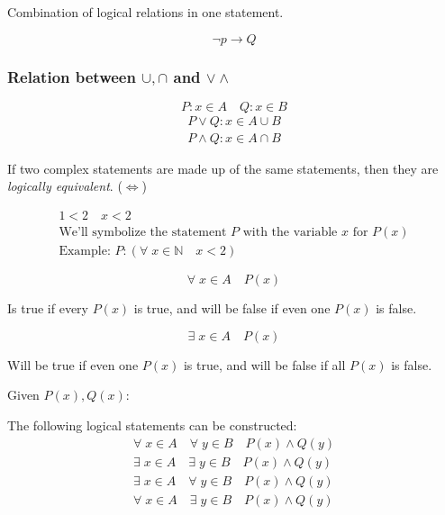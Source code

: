 \documentclass[00_complete]{subfiles}
\begin{document}
\begin{definition}
Combination of logical relations in one statement.
\begin{example}
    $$\neg p \to Q$$
\end{example}
\end{definition}

\subsubsection{Relation between $\cup, \cap$ and $\lor \land$}
$$P : x \in A \quad Q: x \in B$$
$$
\begin{gathered}
    P \lor Q : x \in A \cup B \\
    P \land Q: x \in A \cap B
\end{gathered}
$$

\begin{definition}
If two complex statements are made up of the same statements, then they are
\emph{logically equivalent}. ($\iff$)
\end{definition}

$$
\begin{gathered}
    1<2 \quad x<2 \\
    \text{We'll symbolize the statement $P$ with the variable $x$ for $P(x)$} \\
    \text{Example: }P: (\forall \; x \in \mathbb{N} \quad x<2)
\end{gathered}
$$

$$\forall \; x \in A \quad P(x)$$

Is true if every $P(x)$ is true, and will be false if even one $P(x)$ is false.

$$\exists \; x \in A \quad P(x)$$

Will be true if even one $P(x)$ is true, and will be false if all $P(x)$ is false.

Given $P(x), Q(x)$:

The following logical statements can be constructed:
$$
\begin{gathered}
    \forall \; x \in A \quad \forall \; y \in B \quad P(x) \land Q(y) \\
    \exists \; x \in A \quad \exists \; y \in B \quad P(x) \land Q(y) \\
    \exists \; x \in A \quad \forall \; y \in B \quad P(x) \land Q(y) \\
    \forall \; x \in A \quad \exists \; y \in B \quad P(x) \land Q(y) \\
\end{gathered}
$$
\end{document}
